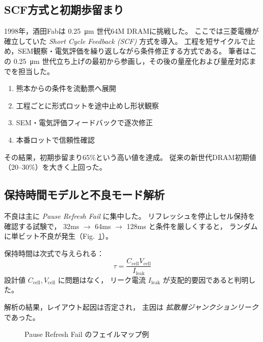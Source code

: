 \documentclass[conference]{IEEEtran}
\let\meter\metre
\begin{document}
\subsection{SCF方式と初期歩留まり}
1998年，酒田Fabは \SI{0.25}{\micro\meter} 世代64M DRAMに挑戦した。
ここでは三菱電機が確立していた \emph{Short Cycle Feedback (SCF)} 方式を導入。
工程を短サイクルで止め，SEM観察・電気評価を繰り返しながら条件修正する方式である。  
筆者はこの \SI{0.25}{\micro\meter} 世代立ち上げの最初から参画し，その後の量産化および量産対応までを担当した。

\begin{enumerate}
  \item 熊本からの条件を流動票へ展開
  \item 工程ごとに形式ロットを途中止めし形状観察
  \item SEM・電気評価フィードバックで逐次修正
  \item 本番ロットで信頼性確認
\end{enumerate}

その結果，初期歩留まり65\%という高い値を達成。
従来の新世代DRAM初期値（20--30\%）を大きく上回った。

\subsection{保持時間モデルと不良モード解析}
不良は主に \emph{Pause Refresh Fail} に集中した。
リフレッシュを停止しセル保持を確認する試験で，
32ms $\rightarrow$ 64ms $\rightarrow$ 128ms と条件を厳しくすると，
ランダムに単ビット不良が発生（Fig.~\ref{fig:failmap}）。

保持時間は次式で与えられる：
\[
\tau = \frac{C_{\mathrm{cell}} V_{\mathrm{cell}}}{I_{\mathrm{leak}}}
\]
設計値 $C_{\mathrm{cell}}, V_{\mathrm{cell}}$ に問題はなく，
リーク電流 $I_{\mathrm{leak}}$ が支配的要因であると判明した。

解析の結果，レイアウト起因は否定され，
主因は \emph{拡散層ジャンクションリーク} であった。

\begin{figure}[t]
\centering
{}
\caption{Pause Refresh Fail のフェイルマップ例}
\label{fig:failmap}
\end{figure}
\end{document}
